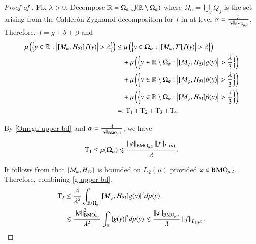 \documentclass[leqno]{amsart}
\begin{document}
\begin{proof}[Proof of ]
Fix $\lambda>0$. Decompose ${\mathbb R}=\Omega_{\alpha}\bigcup({\mathbb R}\setminus\Omega_{\alpha})$ where $\displaystyle\Omega_{\alpha}=\bigcup_{j}Q_{j}$ is the set arising from the Calder\'{o}n-Zygmund decomposition for $f$ in  at level $\alpha=\frac{\lambda}{\left\| \varphi \right\|_{{\rm BMO}_{\mu,2}}}$.
Therefore, $f=g+b+\beta$ and
\begin{align*}
\mu\left(\set{y\in\RR:\left|[M_{\varphi},H_{\D}]f(y)\right|>\lambda}\right)
&\leq\mu\left(\set{y\in\Omega_{\alpha}:\left|[M_{\varphi},T]f(y)\right|>\lambda}\right)\\
&\quad+\mu\left(\set{y\in\RR\setminus\Omega_{\alpha}:\left|[M_{\varphi},H_{\D}]g(y)\right|>\frac{\lambda}{3}}\right)\\
&\quad+\mu\left(\set{y\in\RR\setminus\Omega_{\alpha}:\left|[M_{\varphi},H_{\D}]b(y)\right|>\frac{\lambda}{3}}\right)\\
&\quad+\mu\left(\set{y\in\RR\setminus\Omega_{\alpha}:\left|[M_{\varphi},H_{\D}]\beta(y)\right|>\frac{\lambda}{3}}\right)\\
&=:{\rm T}_{1}+{\rm T}_{2}+{\rm T}_{3}+{\rm T}_{4}.
\end{align*}


By  \eqref{Omega upper bd} and $\alpha=\frac{\lambda}{\left\| \varphi \right\|_{{\rm BMO}_{\mu,2}}}$, we have
\begin{align*}
{\rm T}_{1}\leq\mu(\Omega_{\alpha})
\lesssim\frac{\left\| \varphi \right\|_{{\rm BMO}_{\mu,2}}\left\| f \right\|_{L_{1}(\mu)}}{\lambda}.
\end{align*}



It follows from  that $[M_{\varphi},H_{{\mathcal D}}]$ is bounded on $L_{2}(\mu)$ provided $\varphi\in{\rm BMO}_{\mu,2}$. Therefore, combining  \eqref{g upper bd},
\begin{align*}
{\rm T}_{2}
&\leq\frac{4}{\lambda^{2}}\int_{{\mathbb R}\setminus\Omega_{\alpha}}|[M_{\varphi},H_{{\mathcal D}}]g(y)|^{2}d\mu(y)\\
&\lesssim\frac{\left\| \varphi \right\|_{{\rm BMO}_{\mu,2}}^{2}}{\lambda^{2}}\int_{{\mathbb R}}|g(y)|^{2}d\mu(y)\lesssim\frac{\left\| \varphi \right\|_{{\rm BMO}_{\mu,2}}}{\lambda}\left\| f \right\|_{L_{1}(\mu)}.
\end{align*}



\end{proof}
\end{document}
